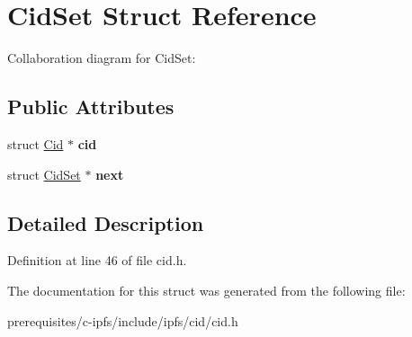 \hypertarget{struct_cid_set}{}\section{Cid\+Set Struct Reference}
\label{struct_cid_set}


Collaboration diagram for Cid\+Set\+:
\subsection*{Public Attributes}
\begin{DoxyCompactItemize}
\item 
\mbox{\label{struct_cid_set_ae6846d1676eef6d0db5dfbafdda77566}} 
struct \mbox{\hyperlink{struct_cid}{Cid}} $\ast$ {\bfseries cid}
\item 
\mbox{\label{struct_cid_set_af4cfa4ef291c2c12561023d788ef4617}} 
struct \mbox{\hyperlink{struct_cid_set}{Cid\+Set}} $\ast$ {\bfseries next}
\end{DoxyCompactItemize}


\subsection{Detailed Description}


Definition at line 46 of file cid.\+h.



The documentation for this struct was generated from the following file\+:\begin{DoxyCompactItemize}
\item 
prerequisites/c-\/ipfs/include/ipfs/cid/cid.\+h\end{DoxyCompactItemize}

